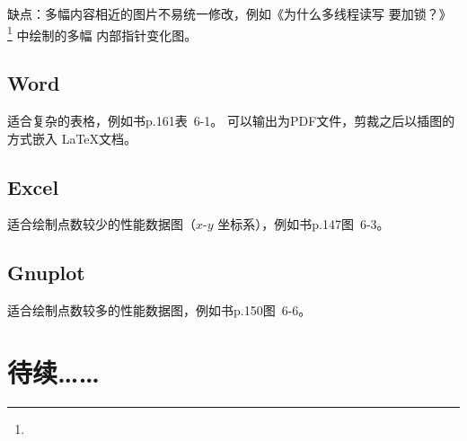 缺点：多幅内容相近的图片不易统一修改，例如《为什么多线程读写  要加锁？》%
\footnote{}
中绘制的多幅  内部指针变化图。

\subsection{Word}
适合复杂的表格，例如书p.161表~6-1。
可以输出为PDF文件，剪裁之后以插图的方式嵌入 \LaTeX 文档。

\subsection{Excel}
适合绘制点数较少的性能数据图（$x$-$y$ 坐标系），例如书p.147图~6-3。

\subsection{Gnuplot}
适合绘制点数较多的性能数据图，例如书p.150图~6-6。


\section{待续……}
